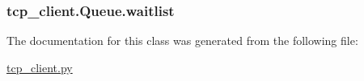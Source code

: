 \hypertarget{classtcp__client_1_1_queue_ad872c06b7212edb7df8adbf02f77eb50}{
\subsubsection[{waitlist}]{\setlength{\rightskip}{0pt plus 5cm}tcp\-\_\-client.\-Queue.\-waitlist}}\label{classtcp__client_1_1_queue_ad872c06b7212edb7df8adbf02f77eb50}


The documentation for this class was generated from the following file\-:\begin{DoxyCompactItemize}
\item 
\hyperlink{tcp__client_8py}{tcp\-\_\-client.\-py}\end{DoxyCompactItemize}
